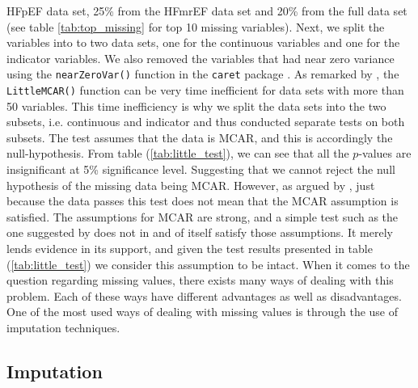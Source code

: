 \documentclass[../thesis.tex]{subfiles}
\begin{document}
 

\noindent HFpEF data set, 25\% from the HFmrEF data set and 20\% from the full data set (see table \ref{tab:top_missing} for top 10 missing variables). Next, we split the variables into to two data sets, one for the continuous variables and one for the indicator variables. We also removed the variables that had near zero variance using the \texttt{nearZeroVar()} function in the \texttt{caret} package \citep{kuhncaret}. As remarked by \cite{BaylorEdPsych}, the \texttt{LittleMCAR()} function can be very time inefficient for data sets with more than 50 variables. This time inefficiency is why we split the data sets into the two subsets, i.e. continuous and indicator and thus conducted separate tests on both subsets. The test assumes that the data is MCAR, and this is accordingly the null-hypothesis. From table (\ref{tab:little_test}), we can see that all the $p$-values are insignificant at 5\% significance level. Suggesting that we cannot reject the null hypothesis of the missing data  
\noindent being MCAR. However, as argued by \cite{allison1999missing}, just because the data passes this test does not mean that the MCAR assumption is satisfied. The assumptions for MCAR are strong, and a simple test such as the one suggested by \cite{little1988test} does not in and of itself satisfy those assumptions. It merely lends evidence in its support, and given the test results presented in table (\ref{tab:little_test}) we consider this assumption to be intact. When it comes to the question regarding missing values, there exists many ways of dealing with this problem. Each of these ways have different advantages as well as disadvantages. One of the most used ways of dealing with missing values is through the use of imputation techniques. 

\vspace*{-0,5cm}\subsection{Imputation}
\label{subsec:impu}
\end{document}
